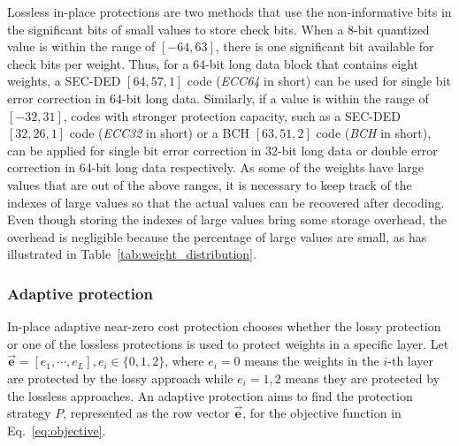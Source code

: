 \documentclass{article}
\begin{document}
Lossless in-place protections are two methods that use the non-informative bits in the significant bits of small values to store check bits. When a 8-bit quantized value is within the range of $[-64, 63]$, there is one significant bit available for check bits per weight. Thus, for a 64-bit long data block that contains eight weights, a SEC-DED $[64, 57, 1]$ code (\textit{ECC64} in short) can be used for single bit error correction in 64-bit long data. Similarly, if a value is within the range of $[-32, 31]$, codes with stronger protection capacity, such as a SEC-DED $[32, 26, 1]$ code (\textit{ECC32} in short) or a  BCH $[63, 51, 2]$ code (\textit{BCH} in short), can be applied for single bit error correction in 32-bit long data or double error correction in 64-bit long data respectively. As some of the weights have large values that are out of the above ranges, it is necessary to keep track of the indexes of large values so that the actual values can be recovered after decoding. 
Even though storing the indexes of large values bring some storage overhead, the overhead is negligible because the percentage of large values are small, as has illustrated in Table~\ref{tab:weight_distribution}.  

\subsubsection{Adaptive protection}
In-place adaptive near-zero cost protection chooses whether the lossy protection or one of the lossless protections is used to protect weights in a specific layer. Let $\overrightarrow{\mathbf{e}} = [e_1, \cdots, e_L], e_i \in \{0, 1, 2\}$, where $e_i = 0$ means the weights in the $i$-th layer are protected by the lossy approach while $e_i = 1, 2$ means they are protected by the lossless approaches. An adaptive protection aims to find the protection strategy $P$, represented as the row vector $\overrightarrow{\mathbf{e}}$, for the objective function in Eq.~\ref{eq:objective}. 

\end{document}
